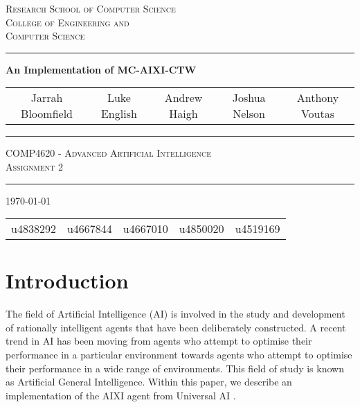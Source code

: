 \documentclass[pdftex,twoside,a4paper]{report}
\begin{document}
\begin{titlepage}
\renewcommand*{\thefootnote}{\fnsymbol{footnote}}
\begin{center}

\textsc{\Large Research School of Computer Science}\\[0.5cm]
\textsc{\Large College of Engineering and}\\[0.2cm]
\textsc{\Large Computer Science}\\[0.5cm]
\vspace{1.4cm}
\hrule
\vspace{1.4cm}
{\huge \bfseries An Implementation of MC-AIXI-CTW} \\
\vspace{0.4cm}


\begin{tabular}{ccccc}
  Jarrah Bloomfield\footnotemark &
  Luke English\footnotemark &
  Andrew Haigh\footnotemark &
  Joshua Nelson\footnotemark &
  Anthony Voutas\footnotemark
\end{tabular}

\vspace{1.4cm}
\hrule
\vspace{1.0cm}
\textsc{\large COMP4620 - Advanced Artificial Intelligence}\\
\textsc{Assignment 2}\\
\vspace{1.0cm}
\hrule
\vspace{1.4cm}
\vfill
{\large \today} \\[0.5cm]

\begin{tabular}{ccccc}
  \setcounter{footnote}{0}
  u4838292\footnotemark &
  u4667844\footnotemark &
  u4667010\footnotemark &
  u4850020\footnotemark &
  u4519169\footnotemark
\end{tabular}
\end{center}
 
\end{titlepage}
\chapter{Introduction}

The field of Artificial Intelligence (AI) is involved in the study and
development of rationally intelligent agents that have been deliberately
constructed. A recent trend in AI has been moving from agents who attempt to
optimise their performance in a particular environment towards agents who
attempt to optimise their performance in a wide range of environments. This
field of study is known as Artificial General Intelligence. Within this paper,
we describe an implementation of the AIXI agent from Universal AI
\citep{hutter2005}.
\end{document}
